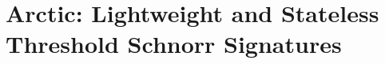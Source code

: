 \chapter{Arctic: Lightweight and Stateless Threshold Schnorr Signatures}
\label{chp:arctic}



%








